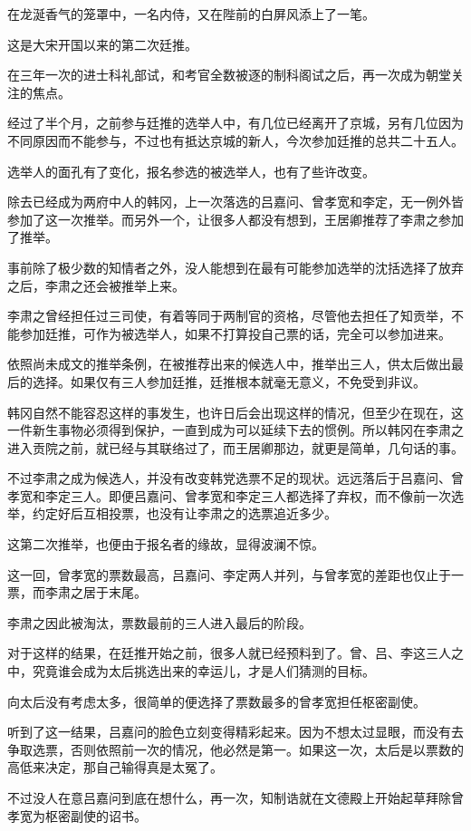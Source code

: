 在龙涎香气的笼罩中，一名内侍，又在陛前的白屏风添上了一笔。

这是大宋开国以来的第二次廷推。

在三年一次的进士科礼部试，和考官全数被逐的制科阁试之后，再一次成为朝堂关注的焦点。

经过了半个月，之前参与廷推的选举人中，有几位已经离开了京城，另有几位因为不同原因而不能参与，不过也有抵达京城的新人，今次参加廷推的总共二十五人。

选举人的面孔有了变化，报名参选的被选举人，也有了些许改变。

除去已经成为两府中人的韩冈，上一次落选的吕嘉问、曾孝宽和李定，无一例外皆参加了这一次推举。而另外一个，让很多人都没有想到，王居卿推荐了李肃之参加了推举。

事前除了极少数的知情者之外，没人能想到在最有可能参加选举的沈括选择了放弃之后，李肃之还会被推举上来。

李肃之曾经担任过三司使，有着等同于两制官的资格，尽管他去担任了知贡举，不能参加廷推，可作为被选举人，如果不打算投自己票的话，完全可以参加进来。

依照尚未成文的推举条例，在被推荐出来的候选人中，推举出三人，供太后做出最后的选择。如果仅有三人参加廷推，廷推根本就毫无意义，不免受到非议。

韩冈自然不能容忍这样的事发生，也许日后会出现这样的情况，但至少在现在，这一件新生事物必须得到保护，一直到成为可以延续下去的惯例。所以韩冈在李肃之进入贡院之前，就已经与其联络过了，而王居卿那边，就更是简单，几句话的事。

不过李肃之成为候选人，并没有改变韩党选票不足的现状。远远落后于吕嘉问、曾孝宽和李定三人。即便吕嘉问、曾孝宽和李定三人都选择了弃权，而不像前一次选举，约定好后互相投票，也没有让李肃之的选票追近多少。

这第二次推举，也便由于报名者的缘故，显得波澜不惊。

这一回，曾孝宽的票数最高，吕嘉问、李定两人并列，与曾孝宽的差距也仅止于一票，而李肃之居于末尾。

李肃之因此被淘汰，票数最前的三人进入最后的阶段。

对于这样的结果，在廷推开始之前，很多人就已经预料到了。曾、吕、李这三人之中，究竟谁会成为太后挑选出来的幸运儿，才是人们猜测的目标。

向太后没有考虑太多，很简单的便选择了票数最多的曾孝宽担任枢密副使。

听到了这一结果，吕嘉问的脸色立刻变得精彩起来。因为不想太过显眼，而没有去争取选票，否则依照前一次的情况，他必然是第一。如果这一次，太后是以票数的高低来决定，那自己输得真是太冤了。

不过没人在意吕嘉问到底在想什么，再一次，知制诰就在文德殿上开始起草拜除曾孝宽为枢密副使的诏书。


